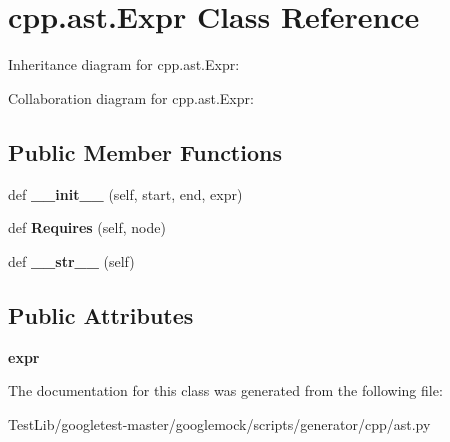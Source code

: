 \hypertarget{classcpp_1_1ast_1_1Expr}{}\section{cpp.\+ast.\+Expr Class Reference}
\label{classcpp_1_1ast_1_1Expr}


Inheritance diagram for cpp.\+ast.\+Expr\+:


Collaboration diagram for cpp.\+ast.\+Expr\+:
\subsection*{Public Member Functions}
\begin{DoxyCompactItemize}
\item 
\mbox{\label{classcpp_1_1ast_1_1Expr_adc83f4b17d6e28a39781678692eb25aa}} 
def {\bfseries \+\_\+\+\_\+init\+\_\+\+\_\+} (self, start, end, expr)
\item 
\mbox{\label{classcpp_1_1ast_1_1Expr_a9c92416eb1285068f190dcda8fd33682}} 
def {\bfseries Requires} (self, node)
\item 
\mbox{\label{classcpp_1_1ast_1_1Expr_a7ee1896fbfa7819adbd0b2f89d11ecec}} 
def {\bfseries \+\_\+\+\_\+str\+\_\+\+\_\+} (self)
\end{DoxyCompactItemize}
\subsection*{Public Attributes}
\begin{DoxyCompactItemize}
\item 
\mbox{\label{classcpp_1_1ast_1_1Expr_a2f4e13fb0176f2616f8703103c806462}} 
{\bfseries expr}
\end{DoxyCompactItemize}


The documentation for this class was generated from the following file\+:\begin{DoxyCompactItemize}
\item 
Test\+Lib/googletest-\/master/googlemock/scripts/generator/cpp/ast.\+py\end{DoxyCompactItemize}
